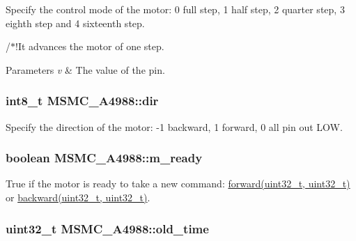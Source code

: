 Specify the control mode of the motor\+: 0 full step, 1 half step, 2 quarter step, 3 eighth step and 4 sixteenth step. 

/$\ast$!\+It advances the motor of one step. 
\begin{DoxyParams}{Parameters}
{\em v} & The value of the pin. \\
\hline
\end{DoxyParams}
\hypertarget{class_m_s_m_c___a4988_a887a3d29966bdfc0d920d339b83e5346}{
\subsubsection[{dir}]{\setlength{\rightskip}{0pt plus 5cm}int8\+\_\+t M\+S\+M\+C\+\_\+\+A4988\+::dir\hspace{0.3cm}{\ttfamily [private]}}}\label{class_m_s_m_c___a4988_a887a3d29966bdfc0d920d339b83e5346}


Specify the direction of the motor\+: -\/1 backward, 1 forward, 0 all pin out L\+O\+W. 

\hypertarget{class_m_s_m_c___a4988_a86ef4c886ee6c7ed6fa87e27c0a7a9ea}{
\subsubsection[{m\+\_\+ready}]{\setlength{\rightskip}{0pt plus 5cm}boolean M\+S\+M\+C\+\_\+\+A4988\+::m\+\_\+ready\hspace{0.3cm}{\ttfamily [private]}}}\label{class_m_s_m_c___a4988_a86ef4c886ee6c7ed6fa87e27c0a7a9ea}


True if the motor is ready to take a new command\+: \hyperlink{class_m_s_m_c___a4988_a9acdbabf546656a6436e89579e8fcfca}{forward(uint32\+\_\+t, uint32\+\_\+t)} or \hyperlink{class_m_s_m_c___a4988_a836bed9e28e723ead2a94446bb704869}{backward(uint32\+\_\+t, uint32\+\_\+t)}. 

\hypertarget{class_m_s_m_c___a4988_a60ff02342382a71526d14fb9e51ddc2a}{
\subsubsection[{old\+\_\+time}]{\setlength{\rightskip}{0pt plus 5cm}uint32\+\_\+t M\+S\+M\+C\+\_\+\+A4988\+::old\+\_\+time\hspace{0.3cm}{\ttfamily [private]}}}\label{class_m_s_m_c___a4988_a60ff02342382a71526d14fb9e51ddc2a}


